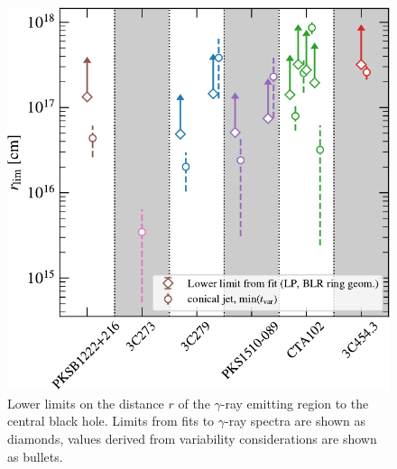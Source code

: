 \documentclass[twocolumn]{aastex62}
\newcommand{\gray}{$\gamma$-ray\xspace}
\begin{document}
\begin{figure}
    \centering
    \includegraphics[width = .9\linewidth]{figures/limits.pdf}
    \caption{Lower limits on the distance $r$ of the \gray emitting region to the central black hole. Limits from fits to \gray spectra are shown as diamonds, values derived from variability considerations are shown as bullets. }
    \label{fig:blr_limits}
\end{figure}
\end{document}

